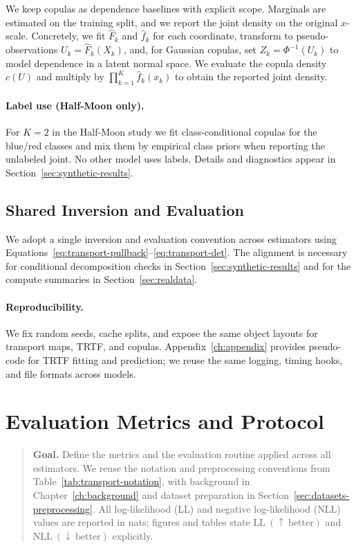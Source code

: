 \documentclass[11pt,a4paper,twoside]{book}\usepackage[]{graphicx}\usepackage[]{xcolor}
\begin{document}
We keep copulas as dependence baselines with explicit scope. Marginals are estimated on the training split, and we report the joint density on the original $x$-scale. Concretely, we fit $\widehat{F}_k$ and $\widehat{f}_k$ for each coordinate, transform to pseudo-observations $U_k = \widehat{F}_k(X_k)$, and, for Gaussian copulas, set $Z_k = \Phi^{-1}(U_k)$ to model dependence in a latent normal space. We evaluate the copula density $c(U)$ and multiply by $\prod_{k=1}^K \widehat{f}_k(x_k)$ to obtain the reported joint density.

\paragraph{Label use (Half-Moon only).} For $K=2$ in the Half-Moon study we fit class-conditional copulas for the blue/red classes and mix them by empirical class priors when reporting the unlabeled joint. No other model uses labels. Details and diagnostics appear in Section~\ref{sec:synthetic-results}.

\subsection{Shared Inversion and Evaluation}

We adopt a single inversion and evaluation convention across estimators using Equations~\eqref{eq:transport-pullback}--\eqref{eq:transport-det}. The alignment is necessary for conditional decomposition checks in Section~\ref{sec:synthetic-results} and for the compute summaries in Section~\ref{sec:realdata}.

\paragraph{Reproducibility.} We fix random seeds, cache splits, and expose the same object layouts for transport maps, TRTF, and copulas. Appendix~\ref{ch:appendix} provides pseudo-code for TRTF fitting and prediction; we reuse the same logging, timing hooks, and file formats across models.
\section{Evaluation Metrics and Protocol}\label{sec:evaluation-protocol}

\begin{quote}
\textbf{Goal.} Define the metrics and the evaluation routine applied across all estimators. We reuse the notation and preprocessing conventions from Table~\ref{tab:transport-notation}, with background in Chapter~\ref{ch:background} and dataset preparation in Section~\ref{sec:datasets-preprocessing}. All log-likelihood (LL) and negative log-likelihood (NLL) values are reported in nats; figures and tables state $\text{LL}~(\uparrow~\text{better})$ and $\text{NLL}~(\downarrow~\text{better})$ explicitly.
\end{quote}
\end{document}
